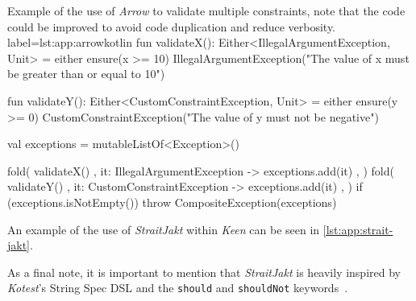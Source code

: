         \begin{code}{
            Example of the use of \textit{Arrow} to validate multiple constraints, note that the code could be improved
            to avoid code duplication and reduce verbosity.
        }{label=lst:app:arrow}{kotlin}
            fun validateX(): Either<IllegalArgumentException, Unit> = either {
                ensure(x >= 10) { IllegalArgumentException("The value of x must be greater than or equal to 10") }
            }

            fun validateY(): Either<CustomConstraintException, Unit> = either {
                ensure(y >= 0) { CustomConstraintException("The value of y must not be negative") }
            }

            val exceptions = mutableListOf<Exception>()

            fold(
                { validateX() },
                { it: IllegalArgumentException -> exceptions.add(it) },
                {}
            )
            fold(
                { validateY() },
                { it: CustomConstraintException -> exceptions.add(it) },
                {}
            )
            if (exceptions.isNotEmpty()) {
                throw CompositeException(exceptions)
            }
        \end{code}

        An example of the use of \textit{StraitJakt} within \textit{Keen} can be seen in \vref{lst:app:strait-jakt}.
        
        As a final note, it is important to mention that \textit{StraitJakt} is heavily inspired by \textit{Kotest}'s
        String Spec DSL and the \texttt{should} and \texttt{shouldNot} keywords~\autocite{KotestKotesta}.
    